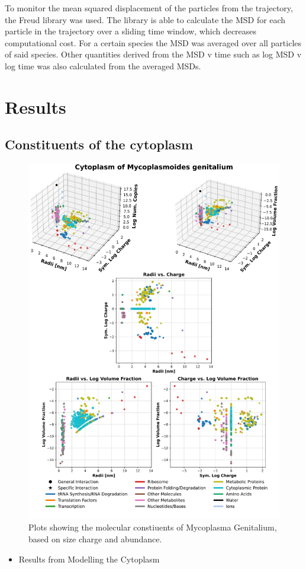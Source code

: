 \documentclass[a4paper,11pt,oneside]{book}
\begin{document}
To monitor the mean squared displacement of the particles from the trajectory, the Freud library was used. The library is able to calculate the MSD for each particle in the trajectory over a sliding time window, which decreases computational cost. For a certain species the MSD was averaged over all particles of said species. Other quantities derived from the MSD v time such as log MSD v log time was also calculated from the averaged MSDs.

\section{Results}

\subsection{Constituents of the cytoplasm}

\begin{figure}[!htbp]
\centering
\includegraphics[width=0.7\linewidth]{files/Fig1-77a0883bc22d4aa609016ce8a1ec042f.png}
\caption[]{Plots showing the molecular constiuents of Mycoplasma Genitalium, based on size charge and abundance.}
\label{Fig1_OmicsPlot}
\end{figure}

\begin{itemize}
\item Results from Modelling the Cytoplasm
\end{itemize}
\end{document}
